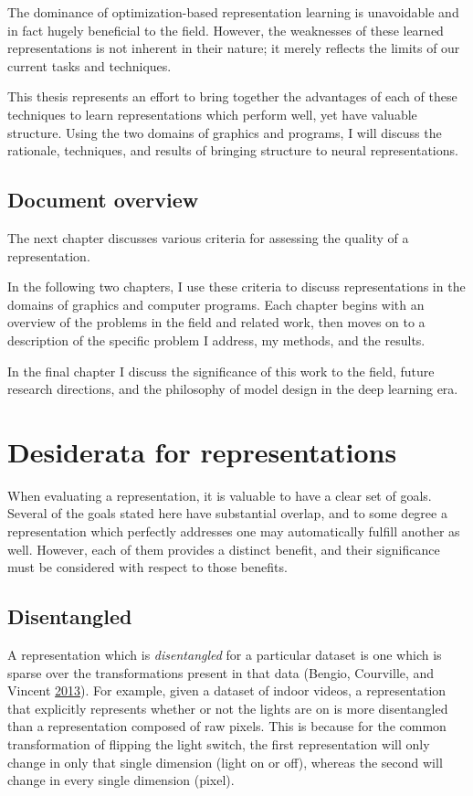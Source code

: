 \documentclass[12pt,twoside]{mitthesis}
\begin{document}
The dominance of optimization-based representation learning is
unavoidable and in fact hugely beneficial to the field. However, the
weaknesses of these learned representations is not inherent in their
nature; it merely reflects the limits of our current tasks and
techniques.

This thesis represents an effort to bring together the advantages of
each of these techniques to learn representations which perform well,
yet have valuable structure. Using the two domains of graphics and
programs, I will discuss the rationale, techniques, and results of
bringing structure to neural representations.

\section{Document overview}\label{document-overview}

The next chapter discusses various criteria for assessing the quality of
a representation.

In the following two chapters, I use these criteria to discuss
representations in the domains of graphics and computer programs. Each
chapter begins with an overview of the problems in the field and related
work, then moves on to a description of the specific problem I address,
my methods, and the results.

In the final chapter I discuss the significance of this work to the
field, future research directions, and the philosophy of model design in
the deep learning era.

\chapter{Desiderata for
representations}\label{desiderata-for-representations}

When evaluating a representation, it is valuable to have a clear set of
goals. Several of the goals stated here have substantial overlap, and to
some degree a representation which perfectly addresses one may
automatically fulfill another as well. However, each of them provides a
distinct benefit, and their significance must be considered with respect
to those benefits.

\section{Disentangled}\label{disentangled}

A representation which is \emph{disentangled} for a particular dataset
is one which is sparse over the transformations present in that data
(Bengio, Courville, and Vincent
\protect\hyperlink{ref-bengio2013representation}{2013}). For example,
given a dataset of indoor videos, a representation that explicitly
represents whether or not the lights are on is more disentangled than a
representation composed of raw pixels. This is because for the common
transformation of flipping the light switch, the first representation
will only change in only that single dimension (light on or off),
whereas the second will change in every single dimension (pixel).
\end{document}
